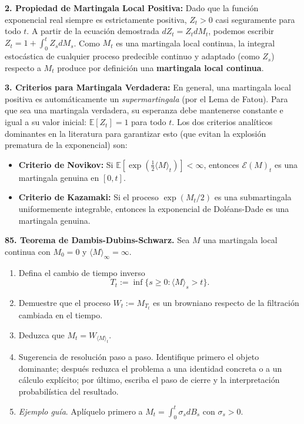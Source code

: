\documentclass[11pt, letterpaper]{article}
\begin{document}
\begin{solucion}
    \textbf{2. Propiedad de Martingala Local Positiva:}
    Dado que la función exponencial real siempre es estrictamente positiva, $Z_t > 0$ casi seguramente para todo $t$.
    A partir de la ecuación demostrada $dZ_t = Z_t dM_t$, podemos escribir $Z_t = 1 + \int_0^t Z_s dM_s$.
    Como $M_t$ es una martingala local continua, la integral estocástica de cualquier proceso predecible continuo y adaptado (como $Z_s$) respecto a $M_t$ produce por definición una \textbf{martingala local continua}.

    \textbf{3. Criterios para Martingala Verdadera:}
    En general, una martingala local positiva es automáticamente un \textit{supermartingala} (por el Lema de Fatou). Para que sea una martingala verdadera, su esperanza debe mantenerse constante e igual a su valor inicial: $\mathbb{E}[Z_t] = 1$ para todo $t$.
    Los dos criterios analíticos dominantes en la literatura para garantizar esto (que evitan la explosión prematura de la exponencial) son:
    \begin{itemize}
        \item \textbf{Criterio de Novikov:} Si $\mathbb{E}\left[ \exp\left( \frac{1}{2} \langle M \rangle_t \right) \right] < \infty$, entonces $\mathcal{E}(M)_t$ es una martingala genuina en $[0, t]$.
        \item \textbf{Criterio de Kazamaki:} Si el proceso $\exp(M_t / 2)$ es una submartingala uniformemente integrable, entonces la exponencial de Doléans-Dade es una martingala genuina.
    \end{itemize}
\end{solucion}

\newpage

\begin{ejercicio}
    \textbf{85. Teorema de Dambis-Dubins-Schwarz.} Sea $M$ una martingala local continua con $M_0=0$ y $\langle M \rangle_\infty = \infty$.
    \begin{enumerate}
        \item Defina el cambio de tiempo inverso
        \[ T_t := \inf\{s \ge 0 : \langle M \rangle_s > t\}. \]
        \item Demuestre que el proceso $W_t := M_{T_t}$ es un browniano respecto de la filtración cambiada en el tiempo.
        \item Deduzca que $M_t = W_{\langle M \rangle_t}$.
        \item Sugerencia de resolución paso a paso. Identifique primero el objeto dominante; después reduzca el problema a una identidad concreta o a un cálculo explícito; por último, escriba el paso de cierre y la interpretación probabilística del resultado.
        \item \textit{Ejemplo guía}. Aplíquelo primero a $M_t = \int_0^t \sigma_s dB_s$ con $\sigma_s > 0$.
    \end{enumerate}
\end{ejercicio}
\end{document}

